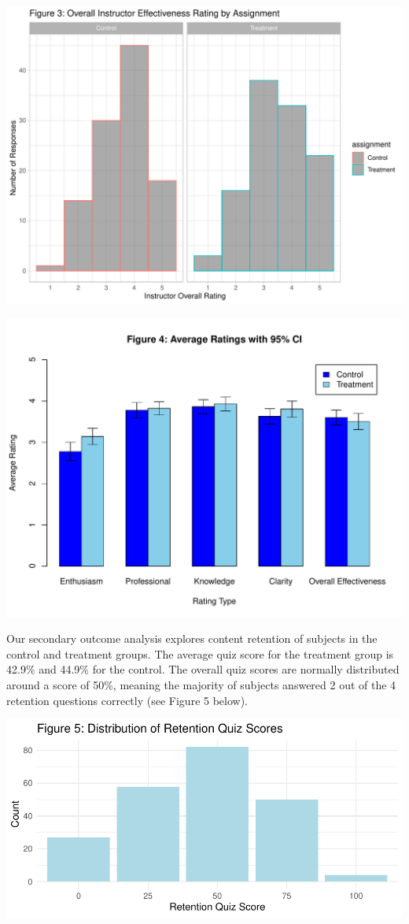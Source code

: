 \documentclass[
]{article}
\begin{document}
\begin{center}\includegraphics[width=0.8\linewidth]{final_project_markdown_files/figure-latex/unnamed-chunk-1-1} \end{center}

\begin{center}\includegraphics[width=0.8\linewidth]{final_project_markdown_files/figure-latex/unnamed-chunk-1-2} \end{center}

Our secondary outcome analysis explores content retention of subjects in
the control and treatment groups. The average quiz score for the
treatment group is 42.9\% and 44.9\% for the control. The overall quiz
scores are normally distributed around a score of 50\%, meaning the
majority of subjects answered 2 out of the 4 retention questions
correctly (see Figure 5 below).

\includegraphics{final_project_markdown_files/figure-latex/unnamed-chunk-2-1.pdf}
\end{document}
